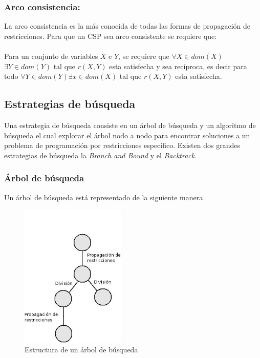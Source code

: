 \subsubsection{Arco consistencia:} 

La arco consistencia es la más conocida de todas las formas de propagación de restricciones. Para que un CSP sea arco consistente se requiere que:
\\ \\
Para un conjunto de variables $X$ e $Y$, se requiere que $ \forall X \in dom(X)$ $\exists Y \in dom(Y)$ tal que $r(X,Y)$ esta satisfecha y sea recíproca, es decir para todo $\forall Y \in dom(Y) \exists x \in dom(X) $ tal que $r(X,Y)$ esta satisfecha.

\subsection{Estrategias de búsqueda}

Una estrategia de búsqueda \cite{Krzysztof} consiste en un árbol de búsqueda y un algoritmo de búsqueda el cual explorar el árbol nodo a nodo para encontrar soluciones a un problema de programación por restricciones específico. Existen dos grandes estrategias de búsqueda la \textit{Branch and Bound} y el \textit{Backtrack}.

\subsubsection{Árbol de búsqueda}

Un árbol de búsqueda está representado de la siguiente manera
\begin{figure}[H]
	\centering
	\includegraphics[width=5cm]{Capitulo2MarcoTeorico/Imagenes/Restri.jpeg}
	\caption{Estructura de un árbol de búsqueda}
	\label{fig:busqueda}	
\end{figure}

